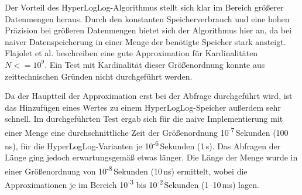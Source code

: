 Der Vorteil des HyperLogLog-Algorithmus stellt sich klar im Bereich größerer Datenmengen heraus.
Durch den konstanten Speicherverbrauch und eine hohen Präzision bei größeren Datenmengen bietet sich der Algorithmus hier an, da bei naiver Datenspeicherung in einer Menge der benötigte Speicher stark ansteigt.
Flajolet et al. \cite{flajolet2007} beschreiben eine gute Approximation für Kardinalitäten $N <= 10^9$.
Ein Test mit Kardinalität dieser Größenordnung konnte aus zeittechnischen Gründen nicht durchgeführt werden.

Da der Hauptteil der Approximation erst bei der Abfrage durchgeführt wird, ist das Hinzufügen eines Wertes zu einem HyperLogLog-Speicher außerdem sehr schnell.
Im durchgeführten Test ergab sich für die naive Implementierung mit einer Menge eine durchschnittliche Zeit der Größenordnung 10\textsuperscript{-7}\,Sekunden (100\,ns), für die HyperLogLog-Varianten je 10\textsuperscript{-6}\,Sekunden (1\,\textmu{}s).
Das Abfragen der Länge ging jedoch erwartungsgemäß etwas länger.
Die Länge der Menge wurde in einer Größenordnung von 10\textsuperscript{-8}\,Sekunden (10\,ns) ermittelt, wobei die Approximationen je im Bereich 10\textsuperscript{-3} bis 10\textsuperscript{-2}\,Sekunden (1--10\,ms) lagen.